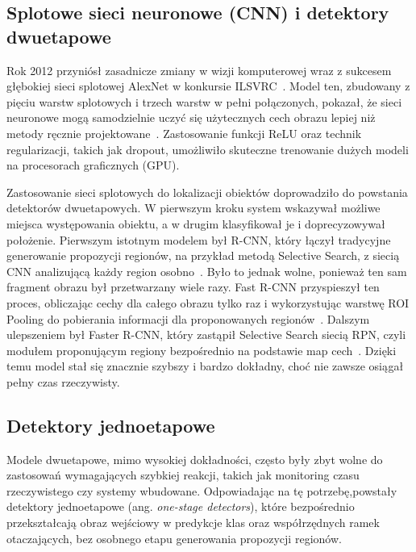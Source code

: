 \subsection{Splotowe sieci neuronowe (CNN) i detektory dwuetapowe}
Rok 2012 przyniósł zasadnicze zmiany w wizji komputerowej wraz z sukcesem głębokiej sieci splotowej
AlexNet w konkursie ILSVRC~\cite{krizhevsky2012imagenet}. Model ten, zbudowany z pięciu warstw
splotowych i trzech warstw w pełni połączonych, pokazał, że sieci neuronowe mogą samodzielnie uczyć
się użytecznych cech obrazu lepiej niż metody ręcznie projektowane~\cite{krizhevsky2012imagenet}.
Zastosowanie funkcji ReLU oraz technik regularizacji, takich jak dropout, umożliwiło skuteczne
trenowanie dużych modeli na procesorach graficznych (GPU).

Zastosowanie sieci splotowych do lokalizacji obiektów doprowadziło do powstania detektorów
dwuetapowych. W pierwszym kroku system wskazywał możliwe miejsca występowania obiektu, a w drugim
klasyfikował je i doprecyzowywał położenie. Pierwszym istotnym modelem był R-CNN, który łączył
tradycyjne generowanie propozycji regionów, na przykład metodą Selective Search, z siecią CNN
analizującą każdy region osobno~\cite{girshick2014rich}. Było to jednak wolne, ponieważ ten sam
fragment obrazu był przetwarzany wiele razy. Fast R-CNN przyspieszył ten proces, obliczając cechy
dla całego obrazu tylko raz i wykorzystując warstwę ROI Pooling do pobierania informacji dla
proponowanych regionów~\cite{girshick2015fast}. Dalszym ulepszeniem był Faster R-CNN, który
zastąpił Selective Search siecią RPN, czyli modułem proponującym regiony bezpośrednio na podstawie
map cech~\cite{ren2015faster}. Dzięki temu model stał się znacznie szybszy i bardzo dokładny, choć
nie zawsze osiągał pełny czas rzeczywisty.

\subsection{Detektory jednoetapowe}

Modele dwuetapowe, mimo wysokiej dokładności, często były zbyt wolne do zastosowań wymagających
szybkiej reakcji, takich jak monitoring czasu rzeczywistego czy systemy wbudowane. Odpowiadając na
tę potrzebę,powstały detektory jednoetapowe (ang. \textit{one-stage detectors}), które bezpośrednio
przekształcają obraz wejściowy w predykcje klas oraz współrzędnych ramek otaczających, bez osobnego
etapu generowania propozycji regionów.

